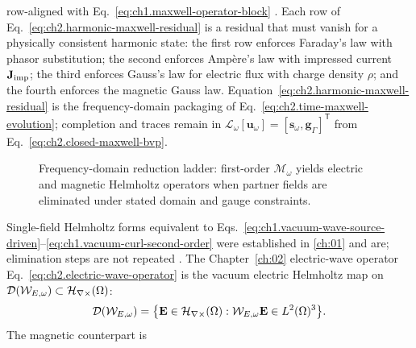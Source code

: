 row-aligned with Eq.~\eqref{eq:ch1.maxwell-operator-block} \cite{stratton1941}.
Each row of Eq.~\eqref{eq:ch2.harmonic-maxwell-residual} is a residual that must
vanish for a physically consistent harmonic state:
the first row enforces Faraday's law with phasor substitution;
the second enforces Amp\`ere's law with impressed current \(\mathbf{J}_{\mathrm{imp}}\);
the third enforces Gauss's law for electric flux with charge density \(\rho\);
and the fourth enforces the magnetic Gauss law.
Equation~\eqref{eq:ch2.harmonic-maxwell-residual} is the frequency-domain packaging
of Eq.~\eqref{eq:ch2.time-maxwell-evolution}; completion and traces remain in
\(\mathcal{L}_\omega[\mathbf{u}_\omega]=[\mathbf{s}_\omega,\mathbf{g}_\Gamma]^{\mathsf{T}}\)
from Eq.~\eqref{eq:ch2.closed-maxwell-bvp}.
\begin{figure}[t]
\centering
{}
\caption{Frequency-domain reduction ladder: first-order \(\mathcal{M}_\omega\)
yields electric and magnetic Helmholtz operators when partner fields are eliminated
under stated domain and gauge constraints.}
\label{fig:ch2.frequency-operator-ladder}
\end{figure}
Single-field Helmholtz forms equivalent to
Eqs.~\eqref{eq:ch1.vacuum-wave-source-driven}--\eqref{eq:ch1.vacuum-curl-second-order}
were established in \ref{ch:01} and are; elimination
steps are not repeated \cite{stratton1941}. The Chapter~\ref{ch:02} electric-wave
operator Eq.~\eqref{eq:ch2.electric-wave-operator} is the vacuum electric Helmholtz
map on \(\mathcal{D}(\mathcal{W}_{E,\omega})\subset\mathcal{H}_{\nabla\times}(\Omega)\):
\begin{equation}
\label{eq:ch2.electric-helmholtz-domain}
\mathcal{D}(\mathcal{W}_{E,\omega})
=
\big\{\mathbf{E}\in\mathcal{H}_{\nabla\times}(\Omega):
\mathcal{W}_{E,\omega}\mathbf{E}\in L^{2}(\Omega)^{3}\big\}.
\end{equation}
The magnetic counterpart is
